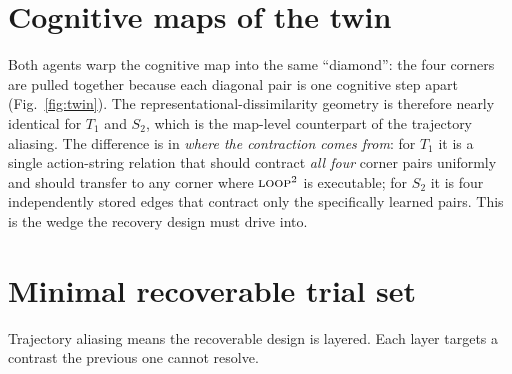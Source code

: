 \documentclass[10pt]{article}
\begin{document}
\section{Cognitive maps of the twin}

Both agents warp the cognitive map into the same ``diamond'': the four corners are pulled
together because each diagonal pair is one cognitive step apart
(Fig.~\ref{fig:twin}). The representational-dissimilarity geometry is therefore nearly
identical for $T_1$ and $S_2$, which is the map-level counterpart of the trajectory
aliasing. The difference is in \emph{where the contraction comes from}: for $T_1$ it is a
single action-string relation that should contract \emph{all four} corner pairs uniformly
and should transfer to any corner where $\textsc{loop}^2$ is executable; for $S_2$ it is
four independently stored edges that contract only the specifically learned pairs. This is
the wedge the recovery design must drive into.

\section{Minimal recoverable trial set}

Trajectory aliasing means the recoverable design is layered. Each layer targets a contrast
the previous one cannot resolve.
\end{document}
